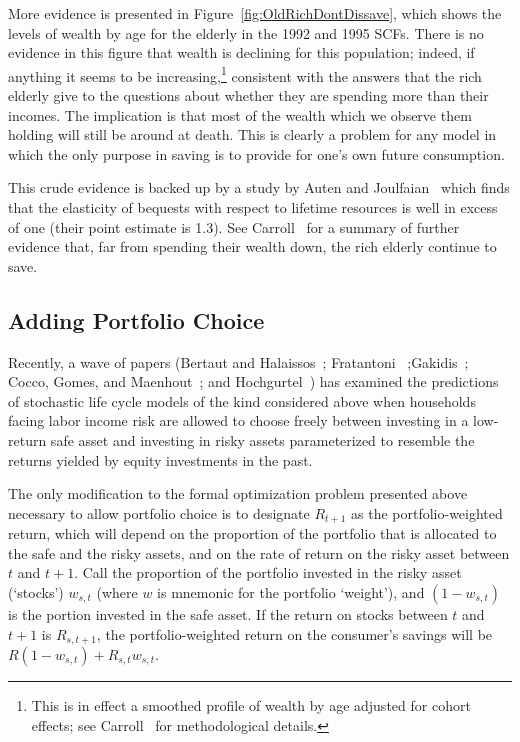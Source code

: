 \documentclass[12pt]{article}
\begin{document}
More evidence is presented in Figure~\ref{fig:OldRichDontDissave}, which
shows the levels of wealth by age for the elderly in the 1992 and 1995 SCFs.
There is no evidence in this figure that wealth is declining for this
population; indeed, if anything it seems to be increasing,\footnote{%
This is in effect a smoothed profile of wealth by age adjusted for cohort
effects; see Carroll~\cite{carroll:richsave} for methodological details.}
consistent with the answers that the rich elderly give to the questions
about whether they are spending more than their incomes. The implication is
that most of the wealth which we observe them holding will still be around
at death. This is clearly a problem for any model in which the only purpose
in saving is to provide for one's own future consumption.

This crude evidence is backed up by a study by Auten and Joulfaian~\cite
{auten&joulfaian:charitable} which finds that the elasticity of bequests
with respect to lifetime resources is well in excess of one (their point
estimate is 1.3). See Carroll~\cite{carroll:richsave} for a summary of
further evidence that, far from spending their wealth down, the rich elderly
continue to save.

\subsection{Adding Portfolio Choice}

Recently, a wave of papers (Bertaut and Halaissos~\cite
{bertaut&haliassos:portfolio}; Fratantoni~\cite{fratantoni:equitypremium}%
;Gakidis~\cite{gakidis:stocksforold}; Cocco, Gomes, and Maenhout~\cite
{cgm:lcportfolio}; and Hochgurtel~\cite{hochgurtel:bufferportfolio}) has
examined the predictions of stochastic life cycle models of the kind
considered above when households facing labor income risk are allowed to
choose freely between investing in a low-return safe asset and investing in
risky assets parameterized to resemble the returns yielded by equity
investments in the past.

The only modification to the formal optimization problem presented above
necessary to allow portfolio choice is to designate $R_{t+1}$ as the
portfolio-weighted return, which will depend on the proportion of the
portfolio that is allocated to the safe and the risky assets, and on the
rate of return on the risky asset between $t$ and $t+1$. Call the proportion
of the portfolio invested in the risky asset (`stocks') $w_{s,t}$ (where $w$
is mnemonic for the portfolio `weight'), and $(1-w_{s,t})$ is the portion
invested in the safe asset. If the return on stocks between $t$ and $t+1$ is 
$R_{s,t+1}$, the portfolio-weighted return on the consumer's savings will be 
$R(1-w_{s,t})+R_{s,t}w_{s,t}$.
\end{document}
